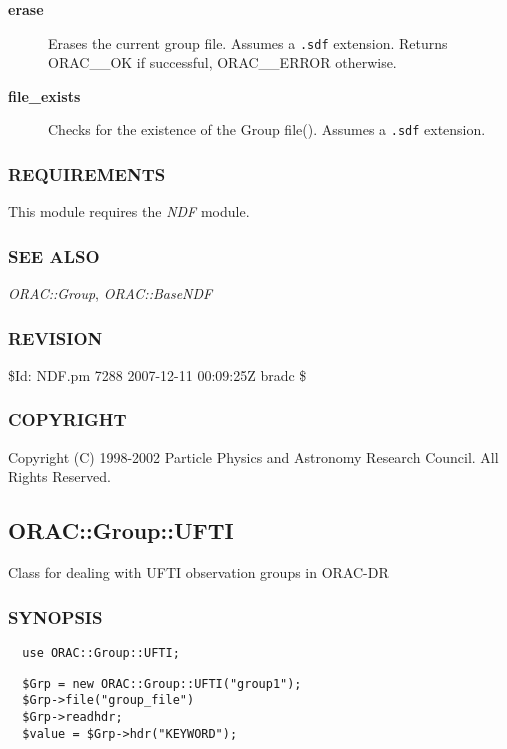 \begin{description}
\begin{description}
\item[{\textbf{erase}}] \mbox{}

Erases the current group file. Assumes a \texttt{.sdf} extension.
Returns ORAC\_\_OK if successful, ORAC\_\_ERROR otherwise.


\item[{\textbf{file\_exists}}] \mbox{}

Checks for the existence of the Group file(). Assumes a \texttt{.sdf}
extension.

\end{description}
\subsubsection*{REQUIREMENTS\label{ORAC::Group::NDF_REQUIREMENTS}}


This module requires the \emph{NDF} module.

\subsubsection*{SEE ALSO\label{ORAC::Group::NDF_SEE_ALSO}}


\emph{ORAC::Group}, \emph{ORAC::BaseNDF}

\subsubsection*{REVISION\label{ORAC::Group::NDF_REVISION}}


\$Id: NDF.pm 7288 2007-12-11 00:09:25Z bradc \$

\subsubsection*{COPYRIGHT\label{ORAC::Group::NDF_COPYRIGHT}}


Copyright (C) 1998-2002 Particle Physics and Astronomy Research
Council. All Rights Reserved.

\subsection{ORAC::Group::UFTI\label{ORAC::Group::UFTI}}


Class for dealing with UFTI observation groups in ORAC-DR

\subsubsection*{SYNOPSIS\label{ORAC::Group::UFTI_SYNOPSIS}}
\begin{verbatim}
  use ORAC::Group::UFTI;
\end{verbatim}
\begin{verbatim}
  $Grp = new ORAC::Group::UFTI("group1");
  $Grp->file("group_file")
  $Grp->readhdr;
  $value = $Grp->hdr("KEYWORD");
\end{verbatim}

\end{description}
